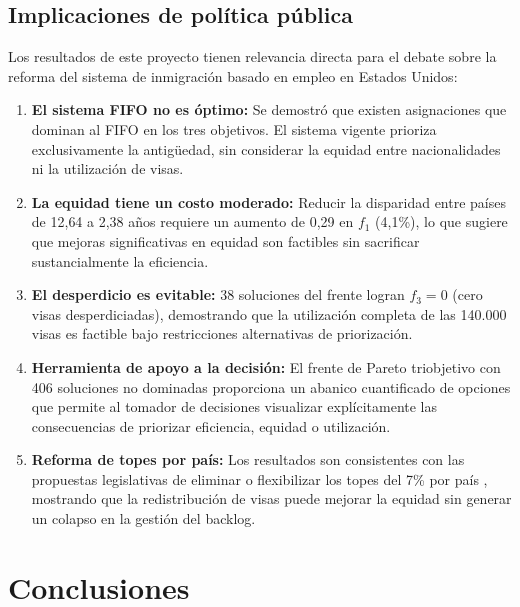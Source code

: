 \documentclass[12pt,letterpaper]{article}
\begin{document}
\subsection{Implicaciones de política pública}

Los resultados de este proyecto tienen relevancia directa para el debate sobre la reforma del sistema de inmigración basado en empleo en Estados Unidos:

\begin{enumerate}
    \item \textbf{El sistema FIFO no es óptimo:} Se demostró que existen asignaciones que dominan al FIFO en los tres objetivos. El sistema vigente prioriza exclusivamente la antigüedad, sin considerar la equidad entre nacionalidades ni la utilización de visas.

    \item \textbf{La equidad tiene un costo moderado:} Reducir la disparidad entre países de 12{,}64 a 2{,}38 años requiere un aumento de 0{,}29 en $f_1$ (4{,}1\%), lo que sugiere que mejoras significativas en equidad son factibles sin sacrificar sustancialmente la eficiencia.

    \item \textbf{El desperdicio es evitable:} 38 soluciones del frente logran $f_3 = 0$ (cero visas desperdiciadas), demostrando que la utilización completa de las 140.000 visas es factible bajo restricciones alternativas de priorización.

    \item \textbf{Herramienta de apoyo a la decisión:} El frente de Pareto triobjetivo con 406 soluciones no dominadas proporciona un abanico cuantificado de opciones que permite al tomador de decisiones visualizar explícitamente las consecuencias de priorizar eficiencia, equidad o utilización.

    \item \textbf{Reforma de topes por país:} Los resultados son consistentes con las propuestas legislativas de eliminar o flexibilizar los topes del 7\% por país \parencite{fwd2024}, mostrando que la redistribución de visas puede mejorar la equidad sin generar un colapso en la gestión del backlog.
\end{enumerate}

\newpage
\section{Conclusiones}
\label{sec:conclusiones}
\end{document}
